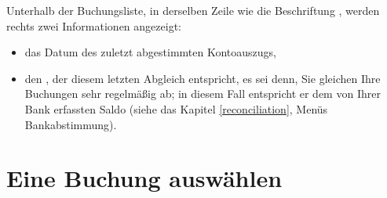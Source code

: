 Unterhalb der Buchungsliste, in derselben Zeile wie die Beschriftung , werden rechts zwei Informationen angezeigt:
\begin{itemize}
	\item das Datum des zuletzt abgestimmten Kontoauszugs,
	\item den , der diesem letzten Abgleich entspricht, es sei denn, Sie gleichen Ihre Buchungen sehr regelmäßig ab; in diesem Fall entspricht er dem von Ihrer Bank erfassten Saldo (siehe das Kapitel \vref{reconciliation}, Menüs {Bankabstimmung}).
\end{itemize}


\section{Eine Buchung auswählen\label{transactions-selection}}


